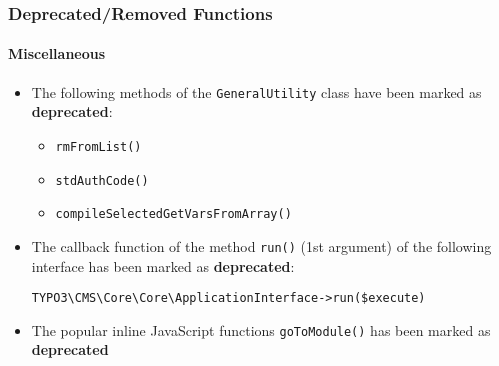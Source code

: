 %

\begin{frame}[fragile]
	\frametitle{Deprecated/Removed Functions}
	\framesubtitle{Miscellaneous}


	\begin{itemize}
		\item The following methods of the \texttt{GeneralUtility} class
			have been marked as \textbf{deprecated}:
			\begin{itemize}
				\item \texttt{rmFromList()}
				\item \texttt{stdAuthCode()}
				\item \texttt{compileSelectedGetVarsFromArray()}
			\end{itemize}

		\item The callback function of the method \texttt{run()} (1st argument)
			of the following interface has been marked as \textbf{deprecated}:
\begin{lstlisting}
TYPO3\CMS\Core\Core\ApplicationInterface->run($execute)
\end{lstlisting}

		\item The popular inline JavaScript functions \texttt{goToModule()}
			has been marked as \textbf{deprecated}

	\end{itemize}

\end{frame}

